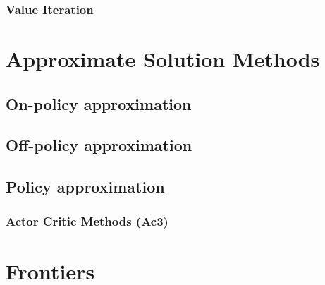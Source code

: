 \documentclass[paper=a4,fontsize=11pt]{scrartcl} %
\numberwithin{equation}{section} %
\numberwithin{figure}{section} %
\numberwithin{table}{section} %
\begin{document}
\subsubsection{Value Iteration}




\section{Approximate Solution Methods}

\subsection{On-policy approximation}

\subsection{Off-policy approximation}

\subsection{Policy approximation}

\subsubsection{Actor Critic Methods (Ac3)}



\section{Frontiers}


\printindex
\end{document}
